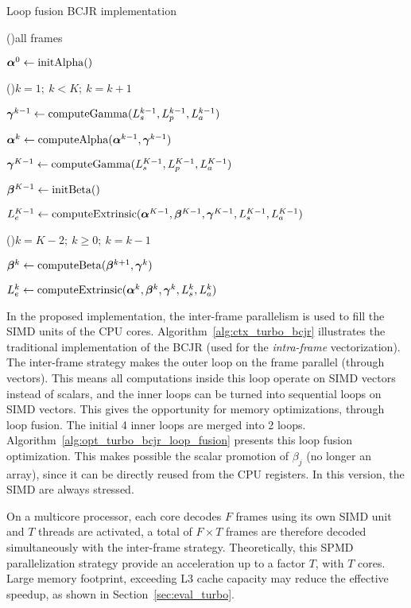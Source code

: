 \begin{algorithm}
  \caption{Loop fusion BCJR implementation}
  \label{alg:opt_turbo_bcjr_loop_fusion}

  \For(){all frames}
  {
    $\boldsymbol{\alpha}^0\gets \operatorname*{initAlpha}()$

    \For(){$k=1;~k<K;~k=k+1$}
    {
      $\boldsymbol{\gamma}^{k-1}\gets \operatorname*{computeGamma}(L_{s}^{k-1}, L_{p}^{k-1}, L_{a}^{k-1})$

      $\boldsymbol{\alpha}^k\gets \operatorname*{computeAlpha}(\boldsymbol{\alpha}^{k-1}, \boldsymbol{\gamma}^{k-1})$
    }

    $\boldsymbol{\gamma}^{K-1}\gets \operatorname*{computeGamma}(L_{s}^{K-1}, L_{p}^{K-1}, L_{a}^{K-1})$

    $\boldsymbol{\beta}^{K-1}\gets \operatorname*{initBeta}()$

    $L_e^{K-1}\gets \operatorname*{computeExtrinsic}(\boldsymbol{\alpha}^{K-1}, \boldsymbol{\beta}^{K-1}, \boldsymbol{\gamma}^{K-1}, L_{s}^{K-1}, L_{a}^{K-1})$

    \For(){$k=K-2;~k \geq 0;~k=k-1$}
    {
      $\boldsymbol{\beta}^k\gets \operatorname*{computeBeta}(\boldsymbol{\beta}^{k+1}, \boldsymbol{\gamma}^{k})$

      $L_e^{k}\gets \operatorname*{computeExtrinsic}(\boldsymbol{\alpha}^{k}, \boldsymbol{\beta}^k, \boldsymbol{\gamma}^{k}, L_{s}^{k}, L_{a}^{k})$
    }
  }
\end{algorithm}

In the proposed implementation, the inter-frame parallelism is used to fill the
SIMD units of the CPU cores. Algorithm~\ref{alg:ctx_turbo_bcjr} illustrates the
traditional implementation of the BCJR (used for the \emph{intra-frame}
vectorization). The inter-frame strategy makes the outer loop on the frame
parallel (through vectors). This means all computations inside this loop operate
on SIMD vectors instead of scalars, and the inner loops can be turned into
sequential loops on SIMD vectors. This gives the opportunity for memory
optimizations, through loop fusion. The initial 4 inner loops are merged into 2
loops. Algorithm~\ref{alg:opt_turbo_bcjr_loop_fusion} presents this loop fusion
optimization. This makes possible the scalar promotion of $\beta_j$ (no longer
an array), since it can be directly reused from the CPU registers. In this
version, the SIMD are always stressed.

On a multicore processor, each core decodes $F$ frames using its own SIMD unit
and $T$ threads are activated, a total of $F\times T$ frames are therefore
decoded simultaneously with the inter-frame strategy. Theoretically, this SPMD
parallelization strategy provide an acceleration up to a factor $T$, with $T$
cores. Large memory footprint, exceeding L3 cache capacity may reduce the
effective speedup, as shown in Section~\ref{sec:eval_turbo}.

